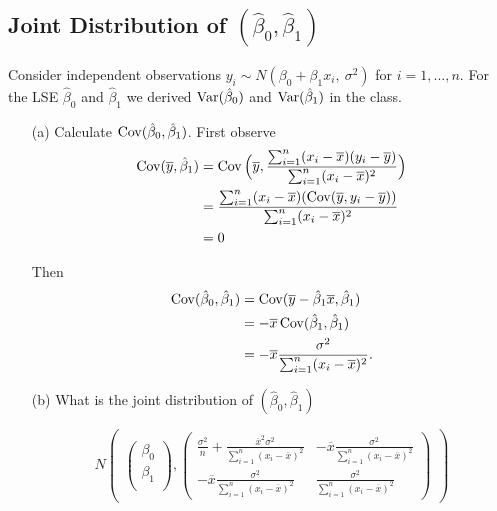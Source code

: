 \documentclass{tufte-book}
\begin{document}
\subsection{Joint Distribution of $(\hat{\beta}_0, \hat{\beta}_1)$} Consider independent observations $y_i \sim N(\beta_0+\beta_1x_i,\ \sigma^2)$ for $i=1,...,n$. For the LSE $\hat{\beta}_0$ and $\hat{\beta}_1$ we derived $\operatorname{Var}(\hat{\beta}_0)$ and $\operatorname{Var}(\hat{\beta}_1)$ in the class.

\begin{enumerate}

\item[(a)] Calculate $\operatorname{Cov}(\hat{\beta}_0,\hat{\beta}_1)$.
First observe
\begin{align*}
\operatorname{Cov}(\overline{y}, \hat{\beta}_1) &= \operatorname{Cov}\Big(\overline{y}, \frac{\sum_{i=1}^n(x_i-\overline{x})(y_i-\overline{y})}{\sum_{i=1}^n(x_i-\overline{x})^2}\Big)\\
&= \frac{\sum_{i=1}^n(x_i - \overline{x})(\operatorname{Cov}(\overline{y}, y_i-\overline{y}))}{\sum_{i=1}^n(x_i-\overline{x})^2}\\
&= 0
\end{align*}

Then
\begin{align*}
\operatorname{Cov}(\hat{\beta}_0, \hat{\beta}_1) &= \operatorname{Cov}(\overline{y}-\hat{\beta}_1\overline{x}, \hat{\beta}_1)\\
&= -\overline{x}\operatorname{Cov}(\hat{\beta}_1,\hat{\beta}_1)\\
&= -\overline{x}\frac{\sigma^2}{\sum_{i=1}^n(x_i-\overline{x})^2}.
\end{align*}

\item[(b)] What is the joint distribution of $(\hat{\beta}_0,\hat{\beta}_1)$

\[ N
\begin{pmatrix}

\begin{pmatrix}
\beta_0\\
\beta_1\\
\end{pmatrix}
,\begin{pmatrix}
\frac{\sigma^2}{n} + \frac{\overline{x}^2\sigma^2}{\sum_{i=1}^n(x_i-\overline{x})^2} & -\overline{x}\frac{\sigma^2}{\sum_{i=1}^n(x_i-\overline{x})^2}\\
-\overline{x}\frac{\sigma^2}{\sum_{i=1}^n(x_i-\overline{x})^2} & \frac{\sigma^2}{\sum_{i=1}^n(x_i-\overline{x})^2}
\end{pmatrix}

\end{pmatrix}
\]
\end{enumerate}
\end{document}
